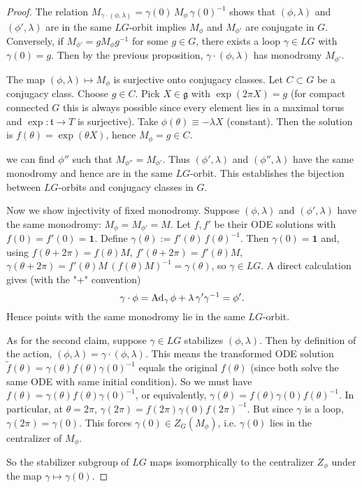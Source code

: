 \documentclass[12pt]{article}
\begin{document}
\begin{proof}
    The relation $M_{\gamma\cdot(\phi,\lambda)} = \gamma(0)\,M_\phi\,\gamma(0)^{-1}$ shows that $(\phi,\lambda)$ and $(\phi',\lambda)$ are in the same $LG$-orbit implies $M_\phi$ and $M_{\phi'}$ are conjugate in $G$. Conversely, if $M_{\phi'} = g M_\phi g^{-1}$ for some $g \in G$, there exists a loop $\gamma \in LG$ with $\gamma(0) = g$. Then by the previous proposition, $\gamma \cdot (\phi,\lambda)$ has monodromy $M_{\phi'}$.

    The map $(\phi,\lambda) \mapsto M_\phi$ is surjective onto conjugacy classes. Let $C\subset G$ be a conjugacy class. Choose $g\in C$. Pick $X\in\mathfrak g$ with $\exp(2\pi X)=g$ (for compact connected $G$ this is always possible since every element lies in a maximal torus and $\exp:\mathfrak t\to T$ is surjective). Take $\phi(\theta)\equiv -\lambda X$ (constant). Then the solution is $f(\theta)=\exp(\theta X)$, hence $M_\phi=g\in C$.

    we can find $\phi''$ such that $M_{\phi''} = M_{\phi'}$. Thus $(\phi',\lambda)$ and $(\phi'',\lambda)$ have the same monodromy and hence are in the same $LG$-orbit. This establishes the bijection between $LG$-orbits and conjugacy classes in $G$.

    Now we show injectivity of fixed monodromy. Suppose $(\phi,\lambda)$ and $(\phi',\lambda)$ have the same monodromy:
    $M_\phi=M_{\phi'}=M$.
    Let $f,f'$ be their ODE solutions with $f(0)=f'(0)=\mathbf 1$. Define
    $\gamma(\theta):=f'(\theta)\,f(\theta)^{-1}$.
    Then $\gamma(0)=\mathbf 1$ and, using $f(\theta+2\pi)=f(\theta)M$, $f'(\theta+2\pi)=f'(\theta)M$,
    $\gamma(\theta+2\pi)=f'(\theta)M\,(f(\theta)M)^{-1}=\gamma(\theta)$,
    so $\gamma\in LG$. A direct calculation gives (with the "+" convention)
    \[
        \gamma\cdot\phi=\operatorname{Ad}_\gamma\phi+\lambda\,\gamma'\gamma^{-1}=\phi'.
    \]
    Hence points with the same monodromy lie in the same $LG$-orbit.

    As for the second claim, suppose $\gamma \in LG$ stabilizes $(\phi,\lambda)$. Then by definition of the action, $(\phi,\lambda) = \gamma\cdot(\phi,\lambda)$. This means the transformed ODE solution $\tilde f(\theta) = \gamma(\theta) f(\theta)\gamma(0)^{-1}$ equals the original $f(\theta)$ (since both solve the same ODE with same initial condition). So we must have $f(\theta) = \gamma(\theta) f(\theta)\gamma(0)^{-1}$, or equivalently, $\gamma(\theta) = f(\theta)\gamma(0)f(\theta)^{-1}$. In particular, at $\theta=2\pi$, $\gamma(2\pi) = f(2\pi)\gamma(0)f(2\pi)^{-1}$. But since $\gamma$ is a loop, $\gamma(2\pi) = \gamma(0)$. This forces $\gamma(0) \in Z_G(M_\phi)$, i.e. $\gamma(0)$ lies in the centralizer of $M_\phi$.

    So the stabilizer subgroup of $LG$ maps isomorphically to the centralizer $Z_\phi$ under the map $\gamma \mapsto \gamma(0)$.
\end{proof}
\end{document}
